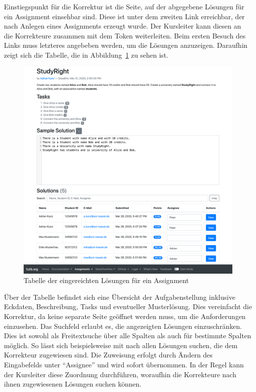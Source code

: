 Einstiegspunkt für die Korrektur ist die Seite, auf der abgegebene Lösungen für ein Assignment einsehbar sind.
Diese ist unter dem zweiten Link erreichbar, der nach Anlegen eines Assignments erzeugt wurde.
Der Kursleiter kann diesen an die Korrekteure zusammen mit dem Token weiterleiten.
Beim ersten Besuch des Links muss letzteres angebeben werden, um die Lösungen anzuzeigen.
Daraufhin zeigt sich die Tabelle, die in Abbildung~\ref{fig:solution-table} zu sehen ist.

\begin{figure}
    \centering
    \includegraphics[width=\textwidth]{chapter/fulib.org/img/solution-table.png}
    \caption{Tabelle der eingereichten Lösungen für ein Assignment}
    \label{fig:solution-table}
\end{figure}

Über der Tabelle befindet sich eine Übersicht der Aufgabenstellung inklusive Eckdaten, Beschreibung, Tasks und eventueller Musterlösung.
Dies vereinfacht die Korrektur, da keine separate Seite geöffnet werden muss, um die Anforderungen einzusehen.
Das Suchfeld erlaubt es, die angezeigten Lösungen einzuschränken.
Dies ist sowohl als Freitextsuche über alle Spalten als auch für bestimmte Spalten möglich.
So lässt sich beispielsweise mit  nach allen Lösungen suchen, die dem Korrekteur  zugewiesen sind.
Die Zuweisung erfolgt durch Ändern des Eingabefelds unter ``Assignee'' und wird sofort übernommen.
In der Regel kann der Kursleiter diese Zuordnung durchführen, woraufhin die Korrekteure nach ihnen zugewiesenen Lösungen suchen können.

